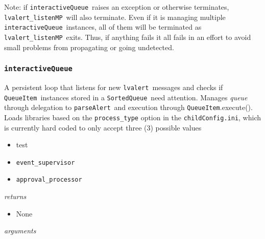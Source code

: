 \documentclass{article}
\newcommand{\alert}{\texttt{lvalert}}
\newcommand{\lvalertListenMP}{\texttt{lvalert\_listenMP}}
\newcommand{\interactiveQueue}{\texttt{interactiveQueue}}
\newcommand{\parseAlert}{\texttt{parseAlert}}
\newcommand{\SortedQueue}{\texttt{SortedQueue}}
\newcommand{\QueueItem}{\texttt{QueueItem}}
\newcommand{\childConfigini}{\texttt{childConfig.ini}}
\newcommand{\approvalProcessor}{\texttt{approval\_processor}}
\newcommand{\eventSupervisor}{\texttt{event\_supervisor}}
\begin{document}
Note: if \interactiveQueue~raises an exception or otherwise terminates, \lvalertListenMP~will also terminate.
Even if it is managing multiple \interactiveQueue~instances, all of them will be terminated as \lvalertListenMP~exits.
Thus, if anything fails it all fails in an effort to avoid small problems from propagating or going undetected.


\subsubsection{\interactiveQueue}
\label{sec: interactiveQueue}

A persistent loop that listens for new \alert~messages and checks if \QueueItem~instances stored in a \SortedQueue~need attention. 
Manages \textit{queue} through delegation to \parseAlert~and execution through \QueueItem.execute(). 
Loads libraries based on the \texttt{process\_type} option in the \childConfigini, which is currently hard coded to only accept three (3) possible values
\begin{itemize}
    \item{test}
    \item{\eventSupervisor}
    \item{\approvalProcessor}
\end{itemize}

\vspace{0.5cm}
\noindent
\textit{returns}

\begin{itemize}
    \item{None}
\end{itemize}

\noindent
\textit{arguments}
\end{document}
